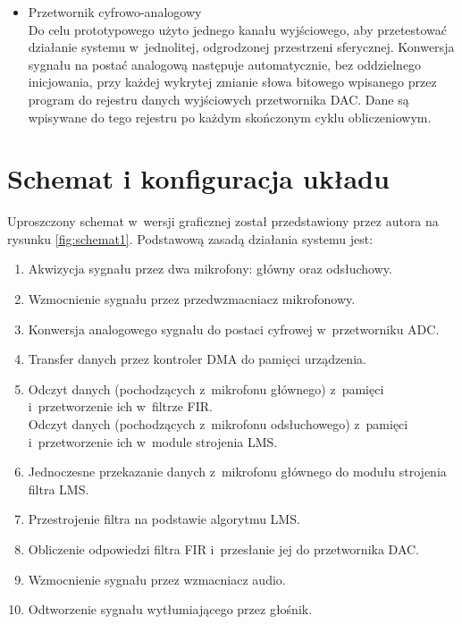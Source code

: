 \begin{enumerate}
\begin{itemize}
		\item Przetwornik cyfrowo-analogowy\\
		Do celu prototypowego użyto jednego kanału wyjściowego, aby przetestować działanie systemu w~jednolitej, odgrodzonej przestrzeni sferycznej. Konwersja sygnału na postać analogową następuje automatycznie, bez oddzielnego inicjowania, przy każdej wykrytej zmianie słowa bitowego wpisanego przez program do rejestru danych wyjściowych przetwornika DAC. Dane są wpisywane do tego rejestru po każdym skończonym cyklu obliczeniowym.
	\end{itemize}
\end{enumerate}

\section{Schemat i konfiguracja układu}
\label{sec:config}
Uproszczony schemat w~wersji graficznej został przedstawiony przez autora na rysunku \ref{fig:schemat1}. Podstawową zasadą działania systemu jest:
\begin{enumerate}
	\item Akwizycja sygnału przez dwa mikrofony: główny oraz odsłuchowy.
	\item Wzmocnienie sygnału przez przedwzmacniacz mikrofonowy.
	\item Konwersja analogowego sygnału do postaci cyfrowej w~przetworniku ADC.
	\item Transfer danych przez kontroler DMA do pamięci urządzenia.
	\item Odczyt danych (pochodzących z~mikrofonu głównego) z~pamięci i~przetworzenie ich w~filtrze FIR.\\
	Odczyt danych (pochodzących z~mikrofonu odsłuchowego) z~pamięci i~przetworzenie ich w~module strojenia LMS.
	\item Jednoczesne przekazanie danych z~mikrofonu głównego do modułu strojenia filtra LMS.
	\item Przestrojenie filtra na podstawie algorytmu LMS.
	\item Obliczenie odpowiedzi filtra FIR i~przesłanie jej do przetwornika DAC.
	\item Wzmocnienie sygnału przez wzmacniacz audio.
	\item Odtworzenie sygnału wytłumiającego przez głośnik.
\end{enumerate}
